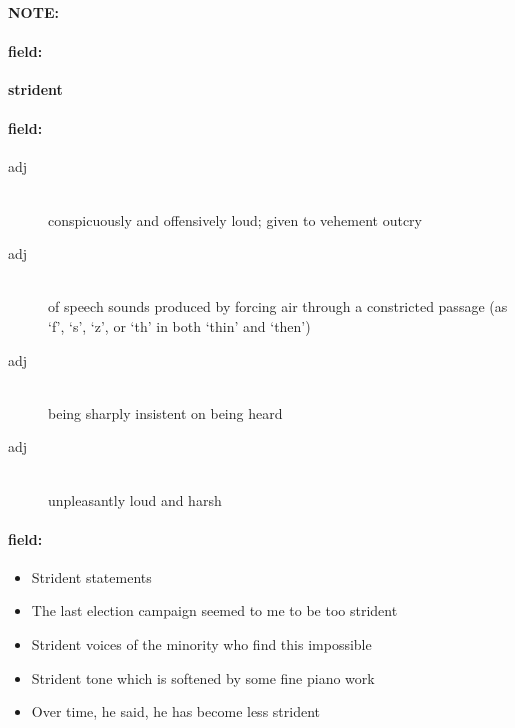 \documentclass[12pt]{article}
\newenvironment{note}{\paragraph{NOTE:}}{}
\newenvironment{field}{\paragraph{field:}}{}
\begin{document}
\begin{note}
\begin{field}
\textbf{\large strident}
\end{field}


\begin{field}
\begin{description}
\item[adj] \hfill \\ 
conspicuously and offensively loud; given to vehement outcry

\item[adj] \hfill \\ 
of speech sounds produced by forcing air through a constricted passage (as `f', `s', `z', or `th' in both `thin' and `then')

\item[adj] \hfill \\ 
being sharply insistent on being heard

\item[adj] \hfill \\ 
unpleasantly loud and harsh

\end{description}
\end{field}

\begin{field}
\begin{itemize}
\item Strident statements
\item The last election campaign seemed to me to be too strident
\item Strident voices of the minority who find this impossible
\item Strident tone which is softened by some fine piano work
\item Over time, he said, he has become less strident
\end{itemize}
\end{field}
\end{note}
\end{document}
